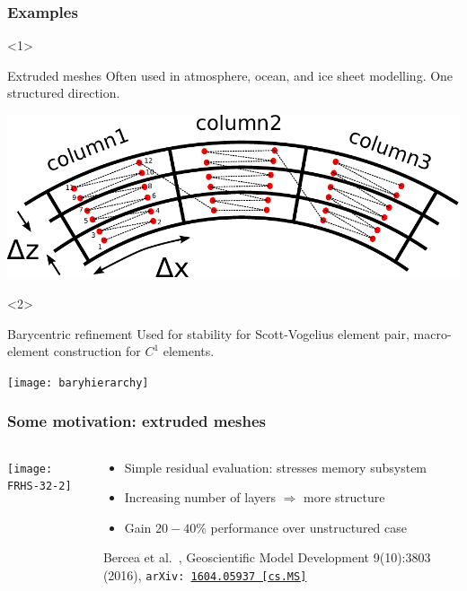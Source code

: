 \documentclass[presentation,aspectratio=43, 10pt]{beamer}
\newcommand{\arxivlink}[2]{{\texttt{arXiv:\,\href{https://arxiv.org/abs/#1}{#1\,[#2]}}}}
\begin{document}
\begin{frame}
  \frametitle{Examples}
  \begin{overlayarea}{\textwidth}{0.9\textheight}
    \begin{onlyenv}<1>
      \begin{block}{Extruded meshes}
        Often used in atmosphere, ocean, and ice sheet modelling. One
        structured direction.

        \begin{center}
          \includegraphics[height=0.4\textheight]{columndofs}
        \end{center}
      \end{block}
    \end{onlyenv}
    \begin{onlyenv}<2>
      \begin{block}{Barycentric refinement}
        Used for stability for Scott-Vogelius element pair,
        macro-element construction for $C^1$ elements.
        \begin{center}
          \texttt{[image: baryhierarchy]}
        \end{center}
      \end{block}
    \end{onlyenv}
  \end{overlayarea}
\end{frame}
\begin{frame}
  \frametitle{Some motivation: extruded meshes}
  \begin{columns}
    \begin{column}{0.6\textwidth}
      \texttt{[image: FRHS-32-2]}
    \end{column}
    \hspace{-1em}
    \begin{column}{0.45\textwidth}
      \begin{itemize}
      \item Simple residual evaluation: stresses memory subsystem
      \item Increasing number of layers $\Rightarrow$ more structure
      \item Gain $20-40\%$ performance over unstructured case
      \end{itemize}
      \begin{flushright}
        {\footnotesize Bercea et al.~, Geoscientific Model Development
          9(10):3803 (2016), \arxivlink{1604.05937}{cs.MS}}
      \end{flushright}
    \end{column}
  \end{columns}
\end{frame}
\end{document}
